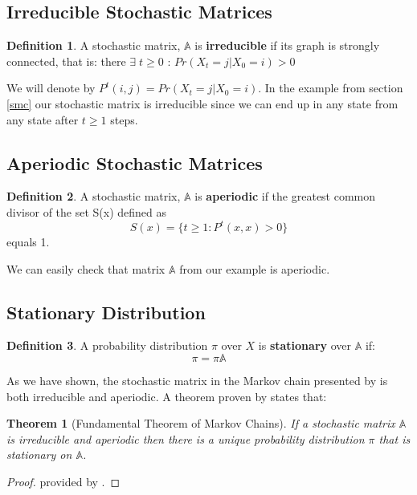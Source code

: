 \documentclass[a4paper,12pt]{article}
\newtheorem{theorem}{Theorem}[section]
\theoremstyle{definition}
\newtheorem{definition}{Definition}[section]
\begin{document}
\subsection{Irreducible Stochastic Matrices}
\begin{definition}
A stochastic matrix, $\mathbb{A}$ is \textbf{irreducible} if its graph is strongly connected, that is: there $\exists \; t \geq 0$ : $Pr(X_{t}=j|X_{0}=i) > 0 $ 
\end{definition}
We will denote by $P^t(i,j)= Pr(X_{t}=j|X_{0}=i) $. In the example from section \ref{smc} our stochastic matrix is irreducible since we can end up in any state from any state after $t \geq 1$ steps.
\subsection{Aperiodic Stochastic Matrices}
\begin{definition}
A stochastic matrix, $\mathbb{A}$ is \textbf{aperiodic} if the greatest common divisor of the set S(x) defined as
\begin{equation*}
S(x) = \{t \geq 1 : P^t(x, x) > 0\}
\end{equation*}
equals 1. 
\end{definition}
We can easily check that matrix $\mathbb{A}$ from our example is aperiodic. 
\subsection{Stationary Distribution}
\begin{definition}
A probability distribution $\pi$ over $X$ is \textbf{stationary} over $\mathbb{A}$ if:
\begin{equation*}
\pi = \pi \mathbb{A}
\end{equation*}
\end{definition}

As we have shown, the stochastic matrix in the Markov chain presented by \cite{hamilton05} is both irreducible and aperiodic. A theorem proven by \cite{Haggstrom02} states that:
\begin{theorem}[Fundamental Theorem of Markov Chains]\label{Haggstrom}
If a stochastic matrix $\mathbb{A}$ is irreducible and aperiodic then there is a unique probability distribution $\pi$ that is stationary on $\mathbb{A}$.
\end{theorem}
\begin{proof}
provided by \cite{Haggstrom02}. 
\end{proof}
\end{document}

